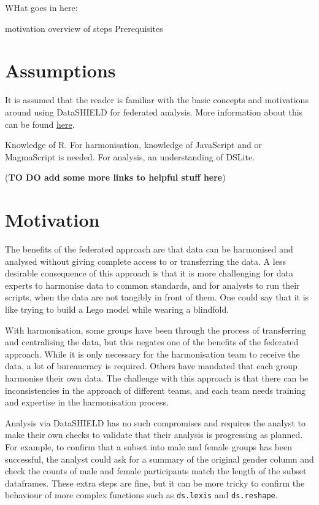 \documentclass[
]{book}
\begin{document}
WHat goes in here:

motivation
overview of steps
Prerequisites

\hypertarget{assumptions}{%
\section{Assumptions}\label{assumptions}}

It is assumed that the reader is familiar with the basic concepts and motivations around using DataSHIELD for federated analysis. More information about this can be found \href{https://isglobal-brge.github.io/resource_bookdown/datashield.html}{here}.

Knowledge of R. For harmonisation, knowledge of JavaScript and or MagmaScript is needed. For analysis, an understanding of DSLite.

(\textbf{TO DO add some more links to helpful stuff here})

\hypertarget{motivation}{%
\section{Motivation}\label{motivation}}

The benefits of the federated approach are that data can be harmonised and analysed without giving complete access to or transferring the data. A less desirable consequence of this approach is that it is more challenging for data experts to harmonise data to common standards, and for analysts to run their scripts, when the data are not tangibly in front of them. One could say that it is like trying to build a Lego model while wearing a blindfold.

With harmonisation, some groups have been through the process of transferring and centralising the data, but this negates one of the benefits of the federated approach. While it is only necessary for the harmonisation team to receive the data, a lot of bureaucracy is required. Others have mandated that each group harmonise their own data. The challenge with this approach is that there can be inconsistencies in the approach of different teams, and each team needs training and expertise in the harmonisation process.

Analysis via DataSHIELD has no such compromises and requires the analyst to make their own checks to validate that their analysis is progressing as planned. For example, to confirm that a subset into male and female groups has been successful, the analyst could ask for a summary of the original gender column and check the counts of male and female participants match the length of the subset dataframes. These extra steps are fine, but it can be more tricky to confirm the behaviour of more complex functions such as \texttt{ds.lexis} and \texttt{ds.reshape}.
\end{document}
